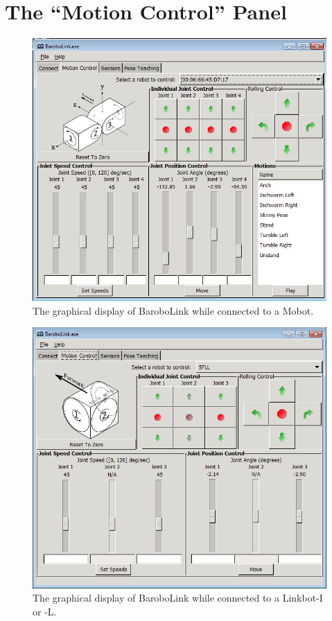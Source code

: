 \documentclass{article}
\begin{document}
\section{ The ``Motion Control'' Panel}
\begin{figure}[H]
\begin{center}
\includegraphics[width=4.5in]{images/robomancer_screenshot5.png}
\end{center}
\caption{\label{fig:shot1_populated.png} The graphical display of BaroboLink
while connected to a Mobot.}
\end{figure}

\begin{figure}[H]
\begin{center}
\includegraphics[width=4.5in]{images/shot1_dof.png}
\end{center}
\caption{\label{fig:shot1_dof.png} The graphical display of BaroboLink
while connected to a Linkbot-I or -L.}
\end{figure}
\end{document}
